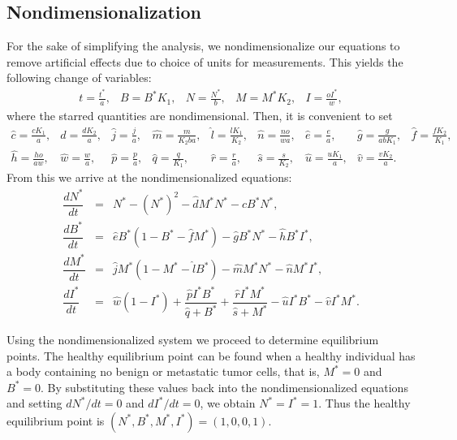\documentclass[letter,10pt]{article}
\begin{document}
\subsection{Nondimensionalization}

For the sake of simplifying the analysis, we nondimensionalize our equations to remove artificial effects due to choice of units for measurements. This yields the following change of variables:
\begin{equation*}
\begin{array}{ccccc}
t=\frac{t^{*}}{a}, & B=B^*K_1, & N=\frac{N^*}{b}, & M=M^*K_2, & I=\frac{oI^*}{w},
\end{array}
\end{equation*}
where the starred quantities are nondimensional. Then, it is convenient to set 
\begin{equation*}
\begin{array}{lllllllll}
\hat{c}=\frac{cK_1}{a}, &\hat{d}=\frac{dK_2}{a}, &\hat{j}=\frac{j}{a}, & \hat{m}=\frac{m}{K_2ba}, & \hat{l}=\frac{lK_1}{K_2}, & \hat{n}=\frac{no}{wa}, &
\hat{e}=\frac{e}{a}, & \hat{g}=\frac{g}{abK_1}, & \hat{f}=\frac{fK_2}{K_1}, \\
\hat{h}=\frac{ho}{aw}, & \hat{w}=\frac{w}{a}, & \hat{p}=\frac{p}{a}, &
\hat{q}=\frac{q}{K_1}, & \hat{r}=\frac{r}{a}, & \hat{s}=\frac{s}{K_2}, & \hat{u}=\frac{uK_1}{a}, &\hat{v}=\frac{vK_2}{a}.
\end{array}
\end{equation*}
From this we arrive at the nondimensionalized equations:
\begin{eqnarray}
\dfrac{dN^*}{dt}&=&N^* - (N^*)^2 - \hat{d}M^*N^*-\hat{c}B^*N^*, \label{N}\\
\dfrac{dB^*}{dt}&=&\hat{e}B^*(1-B^*-\hat{f}M^*)-\hat{g}B^*N^*-\hat{h}B^*I^*, \label{B}\\
\dfrac{dM^*}{dt}&=&\hat{j}M^*(1-M^*-\hat{l}B^*)-\hat{m}M^*N^*-\hat{n}M^*I^*, \label{M}\\
\dfrac{dI^*}{dt}&=&\hat{w}(1-I^*)+\dfrac{\hat{p}I^*B^*}{\hat{q}+B^*}+\dfrac{\hat{r}I^*M^*}{\hat{s}+M^*}-\hat{u}I^*B^*-\hat{v}I^*M^*. \label{I}
\end{eqnarray}

Using the  nondimensionalized system we proceed to determine equilibrium points. The healthy equilibrium point can be found when a healthy individual has a body containing no benign or metastatic tumor cells, that is, $M^*=0$ and $B^*=0$. By substituting these values back into the nondimensionalized equations and setting $dN^*/dt=0$ and $dI^*/dt=0$, we obtain $N^*=I^*=1$. Thus the healthy equilibrium point is $(N^*,B^*,M^*,I^*)=(1,0,0,1)$.
\end{document}
